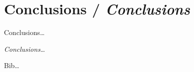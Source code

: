 \documentclass[12pt]{article}
\begin{document}
\section{Conclusions / \emph{Conclusions}}
Conclusions\ldots
\vspace{\baselineskip}
\begin{otherlanguage}{english}\itshape
    \noindent Conclusions\ldots
\end{otherlanguage}
\begin{thebibliography}{99}
    Bib\ldots
\end{thebibliography}
\end{document}
